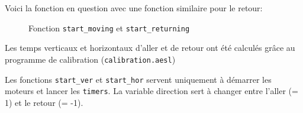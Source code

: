 Voici la fonction en question avec une fonction similaire pour le retour:

\begin{figure}[h]
	\centering
	\caption{Fonction \texttt{start\_moving} et \texttt{start\_returning}}
	\label{fig:startmoving}
\end{figure}

Les temps verticaux et horizontaux d'aller et de retour ont été calculés grâce au programme de calibration (\texttt{calibration.aesl})

Les fonctions \texttt{start\_ver} et \texttt{start\_hor} servent uniquement à démarrer les moteurs et lancer les \texttt{timers}. La variable direction sert à changer entre l'aller (= 1) et le retour (= -1).

